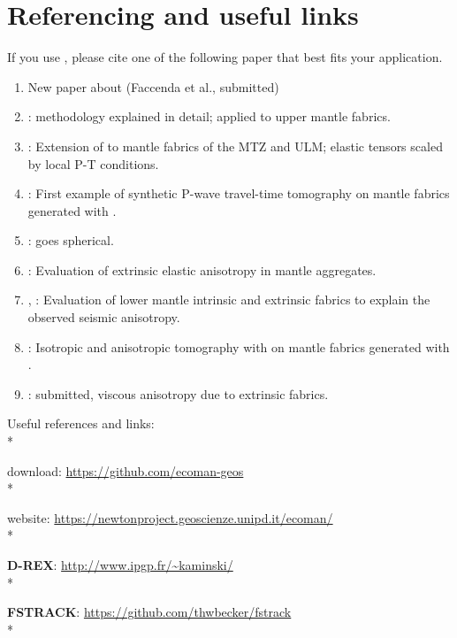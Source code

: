 \section{Referencing and useful links}
If you use \thesistitle{}, please cite one of the following paper that best fits your application.

\begin{enumerate}
    \item New paper about \thesistitle{} (Faccenda et al., submitted)
    \item \citep{faccenda2013g3}: \drexmtitle{} methodology explained in detail; applied to upper mantle fabrics.
    \item \citep{faccenda2014pepi}: Extension of \drexmtitle{} to mantle fabrics of the MTZ and ULM; elastic tensors scaled by local P-T conditions.
    \item \citep{bezada2016g3}: First example of synthetic P-wave travel-time tomography on mantle fabrics generated with \drexmtitle.
    \item \citep{hu2017EPSL}: \drexmtitle{} goes spherical.
    \item \citep{faccenda2019JGR}: Evaluation of extrinsic elastic anisotropy in mantle aggregates.
    \item \citep{ferreira2019natgeo}, \citep{sturgeon2019g3}: Evaluation of lower mantle intrinsic and extrinsic fabrics to explain the observed seismic anisotropy.
    \item \citep{vanderbeek2021,vanderbeek2023}: Isotropic and anisotropic tomography with \psitomotitle{} on mantle fabrics generated with \drexmtitle.
    \item \citep{demontserrat2021}: submitted, viscous anisotropy due to extrinsic fabrics.
\end{enumerate}

\vspace{0.5cm}
Useful references and links:\\*

\textbf{\thesistitle{}} download: \url{https://github.com/ecoman-geos} \\* 

\textbf{\thesistitle{}} website: \url{https://newtonproject.geoscienze.unipd.it/ecoman/} \\*

\textbf{D-REX}: \url{http://www.ipgp.fr/~kaminski/} \citep{kaminski2004gji}\\*

\textbf{FSTRACK}: \url{https://github.com/thwbecker/fstrack} \citep{becker2006epsl}\\*


